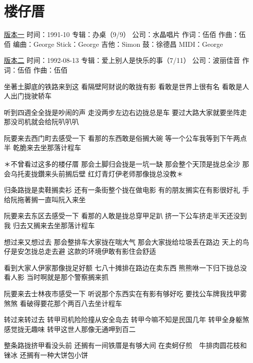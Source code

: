 \documentclass[UTF8,a4paper,oneside,twocolumn,12pt]{ctexbook}
\newcommand{\infopair}[2]{\textbullet #1：#2}
\newcommand{\zc}[1][伍佰]{\infopair{作词}{#1}}
\newcommand{\zq}[1][伍佰]{\infopair{作曲}{#1}}
\newcommand{\bq}[1][伍佰]{\infopair{编曲}{#1}}
\newcommand{\zj}[1]{\infopair{专辑}{#1}}
\newcommand{\sj}[1]{\infopair{时间}{#1}}
\newcommand{\gs}[1]{\infopair{公司}{#1}}
\newenvironment{info}{\begin{flushleft}\kaishu
	}
	{\end{flushleft}\normalsize\yahei\par}
\newenvironment{lyric}{
	}
{}
\begin{document}
\section{楼仔厝}
\begin{info}
	\underline{版本一}
	\sj{1991-10}
	\zj{办桌（9/9）}
	\gs{水晶唱片}
	\zc
	\zq
	\bq[George]
	\infopair{Stick}{George}
	\infopair{吉他}{Simon}
	\infopair{鼓}{徐德昌}
	\infopair{MIDI}{George}
\end{info}
\begin{info}
	\underline{版本二}
	\sj{1992-08-13}
	\zj{爱上别人是快乐的事（7/11）}
	\gs{波丽佳音}
	\zc
	\zq
\end{info}
\begin{lyric}
	坐著土脚底的铁路来到这
	看隔壁阿财说的敢拢有影
	看敢是世界上很有名
	看敢是人人出门拢驶轿车

	听到四週全全拢是吵闹的声
	走没两步左边右边拢总是车
	要过大路大家就要坐阵走
	那没司机就会给阮叭叭叭

	阮要来去西门町去感受一下
	看那的东西敢是俗搁大碗
	等一个公车我等到下午两点半
	乾脆来去坐那落计程车

	＊不曾看过这多的楼仔厝
	那会土脚归会拢是一坑一缺
	那会整个天顶是拢总全沙
	那会乌托麦拢鑽来头前搁后壁
	红灯青灯伊老师那像拢总没教＊

	归条路拢是卖鞋搁卖衫
	还有一条街整个拢在做电影
	有的朋友搁实在有影很好礼
	手给阮拖著搁一直叫阮入来坐

	阮要来去东区去感受一下
	看那的人敢是拢总穿甲足趴
	挤一下公车挤走半天还没到我
	归去又搁来去坐那落计程车

	想过来又想过去
	那会整排车大家拢在喘大气
	那会大家拢给垃圾丢在路边
	天上的鸟仔是安怎拢总走去避
	这款的环境伊敢有影住会舒适

	看到大家人伊家那像拢足好额
	七八十摊排在路边在卖东西
	熊熊咻一下归下拢总没看人影
	当时啊就是那个警察搁来抓

	阮要来去士林夜市感受一下
	听说那个东西实在有影有够好吃
	要找公车牌我找甲雾煞煞
	看破得要花那个两百八去坐计程车

	转过来转过去
	转甲司机险险撞从安全岛去
	转甲今嘛不知是民国几年
	转甲全身躯煞感觉拢无趣味
	转甲这世人那像无通呷到百二

	整条路拢挤甲看没头前
	还搁有一间铁厝是有够大间
	在卖蚵仔煎　牛排肉圆花枝和锉冰
	还搁有一种大饼包小饼
\end{lyric}
\end{document}
